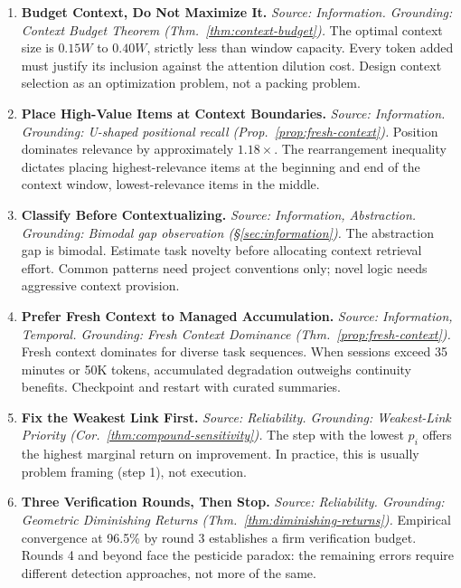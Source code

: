 \documentclass[11pt, a4paper, logo, copyright]{googledeepmind}
\begin{document}
\begin{enumerate}[label=\textbf{P\arabic*.}, leftmargin=3em]

\item \textbf{Budget Context, Do Not Maximize It.}
\emph{Source: Information. Grounding: Context Budget Theorem (Thm.~\ref{thm:context-budget}).}
The optimal context size is $0.15W$ to $0.40W$, strictly less than window capacity. Every token added must justify its inclusion against the attention dilution cost. Design context selection as an optimization problem, not a packing problem.

\item \textbf{Place High-Value Items at Context Boundaries.}
\emph{Source: Information. Grounding: U-shaped positional recall (Prop.~\ref{prop:fresh-context}).}
Position dominates relevance by approximately $1.18\times$. The rearrangement inequality dictates placing highest-relevance items at the beginning and end of the context window, lowest-relevance items in the middle.

\item \textbf{Classify Before Contextualizing.}
\emph{Source: Information, Abstraction. Grounding: Bimodal gap observation (\S\ref{sec:information}).}
The abstraction gap is bimodal. Estimate task novelty before allocating context retrieval effort. Common patterns need project conventions only; novel logic needs aggressive context provision.

\item \textbf{Prefer Fresh Context to Managed Accumulation.}
\emph{Source: Information, Temporal. Grounding: Fresh Context Dominance (Thm.~\ref{prop:fresh-context}).}
Fresh context dominates for diverse task sequences. When sessions exceed 35 minutes or 50K tokens, accumulated degradation outweighs continuity benefits. Checkpoint and restart with curated summaries.

\item \textbf{Fix the Weakest Link First.}
\emph{Source: Reliability. Grounding: Weakest-Link Priority (Cor.~\ref{thm:compound-sensitivity}).}
The step with the lowest $p_i$ offers the highest marginal return on improvement. In practice, this is usually problem framing (step 1), not execution.

\item \textbf{Three Verification Rounds, Then Stop.}
\emph{Source: Reliability. Grounding: Geometric Diminishing Returns (Thm.~\ref{thm:diminishing-returns}).}
Empirical convergence at 96.5\% by round 3 establishes a firm verification budget. Rounds 4 and beyond face the pesticide paradox: the remaining errors require different detection approaches, not more of the same.


\end{enumerate}
\end{document}
